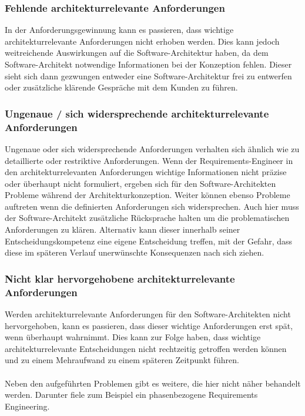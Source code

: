 \subsubsection{Fehlende architekturrelevante Anforderungen}
In der Anforderungsgewinnung kann es passieren, dass wichtige architekturrelevante Anforderungen nicht erhoben werden. Dies kann jedoch weitreichende Auswirkungen auf die Software-Architektur haben, da dem Software-Architekt notwendige Informationen bei der Konzeption fehlen. Dieser sieht sich dann gezwungen entweder eine Software-Architektur frei zu entwerfen oder zusätzliche klärende Gespräche mit dem Kunden zu führen.

\subsubsection{Ungenaue / sich widersprechende architekturrelevante Anforderungen}
Ungenaue oder sich widersprechende Anforderungen verhalten sich ähnlich wie zu detaillierte oder restriktive Anforderungen. Wenn der Requirements-Engineer in den architekturrelevanten Anforderungen wichtige Informationen nicht präzise oder überhaupt nicht formuliert, ergeben sich für den Software-Architekten Probleme während der Architekturkonzeption. Weiter können ebenso Probleme auftreten wenn die definierten Anforderungen sich widersprechen. Auch hier muss der Software-Architekt zusätzliche Rücksprache halten um die problematischen Anforderungen zu klären. Alternativ kann dieser innerhalb seiner Entscheidungskompetenz eine eigene Entscheidung treffen, mit der Gefahr, dass diese im späteren Verlauf unerwünschte Konsequenzen nach sich ziehen.

\subsubsection{Nicht klar hervorgehobene architekturrelevante Anforderungen}
Werden architekturrelevante Anforderungen für den Software-Architekten nicht hervorgehoben, kann es passieren, dass dieser wichtige Anforderungen erst spät, wenn überhaupt wahrnimmt. Dies kann zur Folge haben, dass wichtige architekturrelevante Entscheidungen nicht rechtzeitig getroffen werden können und zu einem Mehraufwand zu einem späteren Zeitpunkt führen.\\
\\

Neben den aufgeführten Problemen gibt es weitere, die hier nicht näher behandelt werden. Darunter fiele zum Beispiel ein phasenbezogene Requirements Engineering.
